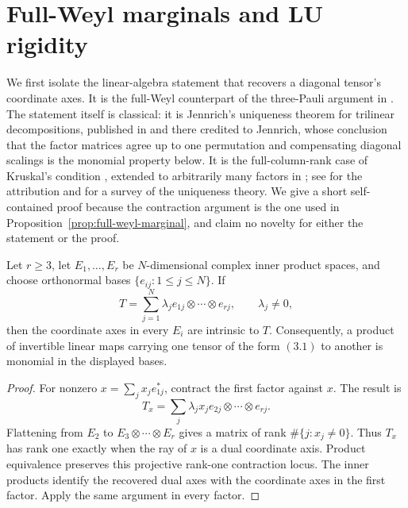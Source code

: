 \section{Full-Weyl marginals and LU rigidity}\label{sec:rigidity}

We first isolate the linear-algebra statement that recovers a diagonal
tensor's coordinate axes.  It is the full-Weyl counterpart of the
three-Pauli argument in \cite{Rains1999,VanDenNestDehaeneDeMoor2005}.
The statement itself is classical: it is Jennrich's uniqueness theorem for
trilinear decompositions, published in \cite[\S V]{Harshman1970} and there
credited to Jennrich, whose conclusion that the factor matrices agree up to
one permutation and compensating diagonal scalings is the monomial property
below.  It is the full-column-rank case of Kruskal's condition
\cite{Kruskal1977}, extended to arbitrarily many factors in
\cite{SidiropoulosBro2000}; see \cite[\S3.2]{KoldaBader2009} for the
attribution and for a survey of the uniqueness theory.  We give a short
self-contained proof because the contraction argument is the one used in
Proposition~\ref{prop:full-weyl-marginal}, and claim no novelty for either
the statement or the proof.

\begin{lemma}\label{lem:diagonal-axes}
Let \(r\geq3\), let \(E_1,\ldots,E_r\) be \(N\)-dimensional complex inner
product spaces, and choose orthonormal bases
\(\{e_{ij}:1\leq j\leq N\}\).  If
\[
 T=\sum_{j=1}^N\lambda_j
 e_{1j}\otimes\cdots\otimes e_{rj},\qquad \lambda_j\ne0,       \tag{3.1}
\]
then the coordinate axes in every \(E_i\) are intrinsic to \(T\).
Consequently, a product of invertible linear maps carrying one tensor of
the form \((3.1)\) to another is monomial in the displayed bases.
\end{lemma}

\begin{proof}
For nonzero \(x=\sum_jx_je_{1j}^*\), contract the first factor against
\(x\).  The result is
\[
 T_x=\sum_j\lambda_jx_j e_{2j}\otimes\cdots\otimes e_{rj}.
\]
Flattening from \(E_2\) to \(E_3\otimes\cdots\otimes E_r\) gives a matrix
of rank \(\#\{j:x_j\ne0\}\).  Thus \(T_x\) has rank one exactly when
the ray of \(x\) is a dual coordinate axis.  Product equivalence preserves
this projective rank-one contraction locus.  The inner products identify
the recovered dual axes with the coordinate axes in the first factor.
Apply the same argument in every factor.
\end{proof}

